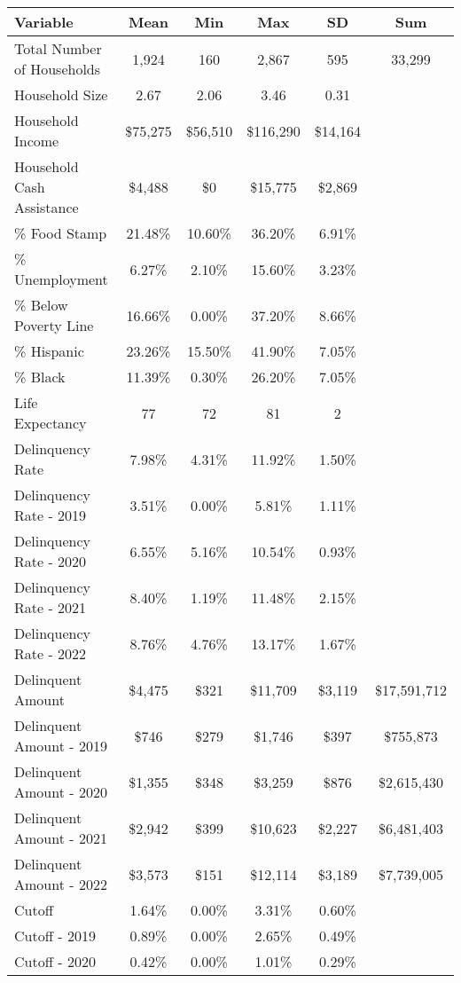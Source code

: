 \begin{tabular}{l|c|c|c|c|c}
\toprule 
\midrule 
Variable & Mean & Min & Max & SD & Sum \\
\midrule 
Total Number of Households & 1,924 & 160 & 2,867 & 595 & 33,299 \\
\quad Household Size & 2.67 & 2.06 & 3.46 & 0.31 \\
Household Income & \$75,275 & \$56,510 & \$116,290 & \$14,164 \\
\quad Household Cash Assistance & \$4,488 & \$0 & \$15,775 & \$2,869 \\
\% Food Stamp & 21.48\% & 10.60\% & 36.20\% & 6.91\% \\
\% Unemployment & 6.27\% & 2.10\% & 15.60\% & 3.23\% \\
\% Below Poverty Line & 16.66\% & 0.00\% & 37.20\% & 8.66\% \\
\% Hispanic & 23.26\% & 15.50\% & 41.90\% & 7.05\% \\
\% Black & 11.39\% & 0.30\% & 26.20\% & 7.05\% \\
Life Expectancy & 77 & 72 & 81 & 2 \\
\midrule 
Delinquency Rate & 7.98\% & 4.31\% & 11.92\% & 1.50\% \\
\quad Delinquency Rate - 2019 & 3.51\% & 0.00\% & 5.81\% & 1.11\% \\
\quad Delinquency Rate - 2020 & 6.55\% & 5.16\% & 10.54\% & 0.93\% \\
\quad Delinquency Rate - 2021 & 8.40\% & 1.19\% & 11.48\% & 2.15\% \\
\quad Delinquency Rate - 2022 & 8.76\% & 4.76\% & 13.17\% & 1.67\% \\
\midrule 
Delinquent Amount & \$4,475 & \$321 & \$11,709 & \$3,119 & \$17,591,712 \\
\quad Delinquent Amount - 2019 & \$746 & \$279 & \$1,746 & \$397 & \$755,873 \\
\quad Delinquent Amount - 2020 & \$1,355 & \$348 & \$3,259 & \$876 & \$2,615,430 \\
\quad Delinquent Amount - 2021 & \$2,942 & \$399 & \$10,623 & \$2,227 & \$6,481,403 \\
\quad Delinquent Amount - 2022 & \$3,573 & \$151 & \$12,114 & \$3,189 & \$7,739,005 \\
\midrule 
Cutoff & 1.64\% & 0.00\% & 3.31\% & 0.60\% \\
\quad Cutoff - 2019 & 0.89\% & 0.00\% & 2.65\% & 0.49\% \\
\quad Cutoff - 2020 & 0.42\% & 0.00\% & 1.01\% & 0.29\% \\

\end{tabular}
